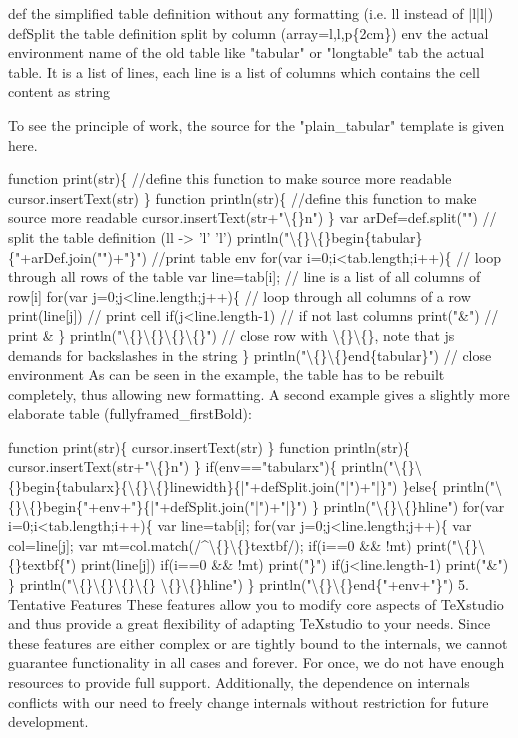 \documentclass{article}
\begin{document}
	def the simplified table definition without any formatting (i.e. ll instead of |l|l|)
	defSplit the table definition split by column (array=l,l,p\{2cm\})
	env the actual environment name of the old table like "tabular" or "longtable"
	tab the actual table. It is a list of lines, each line is a list of columns which contains the cell content as string
	
	To see the principle of work, the source for the "plain\_tabular" template is given here.
	
	function print(str)\{ //define this function to make source more readable
	cursor.insertText(str)
	\}
	function println(str)\{ //define this function to make source more readable
	cursor.insertText(str+"\textbackslash\{\}n")
	\}
	var arDef=def.split("") // split the table definition (ll -> 'l' 'l')
	println("\textbackslash\{\}\textbackslash\{\}begin\{tabular\}\{"+arDef.join("")+"\}") //print table env
	for(var i=0;i<tab.length;i++)\{  // loop through all rows of the table
	var line=tab[i];  // line is a list of all columns of row[i]
	for(var j=0;j<line.length;j++)\{ // loop through all columns of a row
	print(line[j]) // print cell
	if(j<line.length-1) // if not last columns
	print("\&") // print \&
	\}
	println("\textbackslash\{\}\textbackslash\{\}\textbackslash\{\}\textbackslash\{\}") // close row with \textbackslash\{\}\textbackslash\{\}, note that js demands for backslashes in the string
	\}
	println("\textbackslash\{\}\textbackslash\{\}end\{tabular\}") // close environment
	As can be seen in the example, the table has to be rebuilt completely, thus allowing new formatting. A second example gives a slightly more elaborate table (fullyframed\_firstBold):
	
	function print(str)\{
	cursor.insertText(str)
	\}
	function println(str)\{
	cursor.insertText(str+"\textbackslash\{\}n")
	\}
	if(env=="tabularx")\{
	println("\textbackslash\{\}\textbackslash\{\}begin\{tabularx\}\{\textbackslash\{\}\textbackslash\{\}linewidth\}\{|"+defSplit.join("|")+"|\}")
	\}else\{
	println("\textbackslash\{\}\textbackslash\{\}begin\{"+env+"\}\{|"+defSplit.join("|")+"|\}")
	\}
	println("\textbackslash\{\}\textbackslash\{\}hline")
	for(var i=0;i<tab.length;i++)\{
	var line=tab[i];
	for(var j=0;j<line.length;j++)\{
	var col=line[j];
	var mt=col.match(/\^{}\textbackslash\{\}\textbackslash\{\}textbf/);
	if(i==0 \&\& !mt)
	print("\textbackslash\{\}\textbackslash\{\}textbf\{")
	print(line[j])
	if(i==0 \&\& !mt)
	print("\}")
	if(j<line.length-1)
	print("\&")
	\}
	println("\textbackslash\{\}\textbackslash\{\}\textbackslash\{\}\textbackslash\{\} \textbackslash\{\}\textbackslash\{\}hline")
	\}
	println("\textbackslash\{\}\textbackslash\{\}end\{"+env+"\}")
	5. Tentative Features
	These features allow you to modify core aspects of TeXstudio and thus provide a great flexibility of adapting TeXstudio to your needs. Since these features are either complex or are tightly bound to the internals, we cannot guarantee functionality in all cases and forever. For once, we do not have enough resources to provide full support. Additionally, the dependence on internals conflicts with our need to freely change internals without restriction for future development.
	
\end{document}
